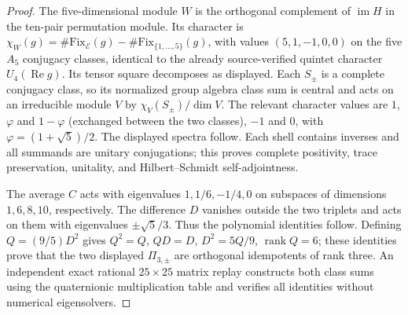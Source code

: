 \documentclass[11pt]{article}
\begin{document}
\begin{proof}
The five-dimensional module $W$ is the orthogonal complement of
$\operatorname{im}H$ in the ten-pair permutation module.  Its character
is $\chi_W(g)=\#\mathrm{Fix}_{\mathscr E}(g)-\#\mathrm{Fix}_{\{1,\ldots,5\}}(g)$,
with values $(5,1,-1,0,0)$ on the five $A_5$ conjugacy classes,
identical to the already source-verified quintet character
$U_4(\operatorname{Re}g)$.  Its tensor square decomposes as displayed.
Each $S_\pm$ is a complete conjugacy class, so its normalized group
algebra class sum is central and acts on an irreducible module $V$
by $\chi_V(S_\pm)/\dim V$.  The relevant character values are
$1$, $\varphi$ and $1-\varphi$ (exchanged between the two classes),
$-1$ and $0$, with $\varphi=(1+\sqrt5)/2$.  The displayed spectra follow.
Each shell contains inverses and all summands are unitary conjugations;
this proves complete positivity, trace preservation, unitality, and
Hilbert--Schmidt self-adjointness.

The average $C$ acts with eigenvalues $1,1/6,-1/4,0$ on subspaces
of dimensions $1,6,8,10$, respectively.  The difference $D$ vanishes
outside the two triplets and acts on them with eigenvalues
$\pm\sqrt5/3$.  Thus the polynomial identities follow.  Defining
$Q=(9/5)D^2$ gives $Q^2=Q$, $QD=D$, $D^2=5Q/9$, $\operatorname{rank}Q=6$;
these identities prove that the two displayed $\Pi_{3,\pm}$ are
orthogonal idempotents of rank three.  An independent exact rational
$25\times25$ matrix replay constructs both class sums using the
quaternionic multiplication table and verifies all identities without
numerical eigensolvers.
\end{proof}
\end{document}
